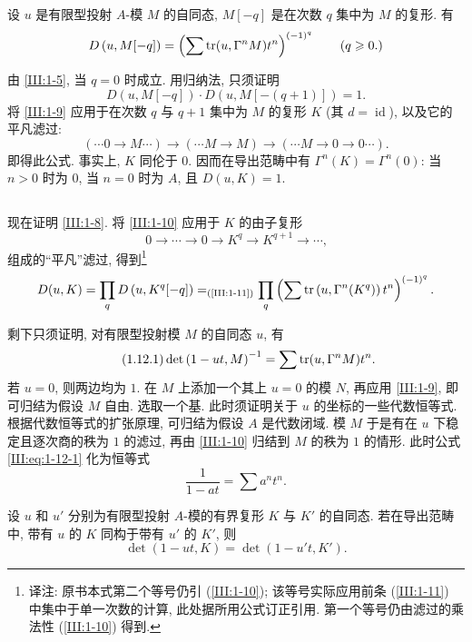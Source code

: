 \begin{lemma_}\label{III:1-11}
设 $u$ 是有限型投射 $A$-模 $M$ 的自同态, $M[-q]$ 是在次数 $q$ 集中为 $M$ 的复形. 有
\[
  D\left(u,M[-q]\right) = \left(\sum \operatorname{tr}(u,\Gamma^n M) t^n\right)^{(-1)^q} \qquad \text{($q\geqslant 0$.)}
\]
\end{lemma_}

由 \ref{III:1-5}, 当 $q=0$ 时成立. 用归纳法, 只须证明
\[
  D\left(u,M[-q]\right) \cdot D\left(u,M[-(q+1)]\right) = 1 \text{.}
\]
将 \ref{III:1-9} 应用于在次数 $q$ 与 $q+1$ 集中为 $M$ 的复形 $K$ (其 $d=\operatorname{id}$), 以及它的平凡滤过:
\[
  (\cdots 0 \to M \cdots) \to (\cdots M \to M) \to (\cdots M \to 0 \to 0 \cdots) \text{.}
\]
即得此公式. 事实上, $K$ 同伦于 $0$. 因而在导出范畴中有 $\Gamma^n(K)=\Gamma^n(0)$: 当 $n>0$ 时为 $0$, 当 $n=0$ 时为 $A$, 且 $D(u,K)=1$.

\subsection{}\label{III:1-12}

现在证明 \ref{III:1-8}. 将 \ref{III:1-10} 应用于 $K$ 的由子复形
\[
  0 \to \cdots \to 0 \to K^q \to K^{q+1} \to \cdots \text{,}
\]
组成的“平凡”滤过, 得到\footnote{译注: 原书本式第二个等号仍引 (\ref{III:1-10}); 该等号实际应用前条 (\ref{III:1-11}) 中集中于单一次数的计算, 此处据所用公式订正引用. 第一个等号仍由滤过的乘法性 (\ref{III:1-10}) 得到.}
\[
  D(u,K) = \prod_q D\left(u,K^q[-q]\right) =_{\text{(\ref{III:1-11})}} \prod_q \left(\sum \operatorname{tr}\left(u,\Gamma^n(K^q)\right) t^n \right)^{(-1)^q} \text{.}
\]

剩下只须证明, 对有限型投射模 $M$ 的自同态 $u$, 有
\begin{equation*}\tag{1.12.1}\label{III:eq:1-12-1}
  \det\left(1-u t,M\right)^{-1} = \sum \operatorname{tr}(u,\Gamma^n M) t^n \text{.}
\end{equation*}
若 $u=0$, 则两边均为 $1$. 在 $M$ 上添加一个其上 $u=0$ 的模 $N$, 再应用 \ref{III:1-9}, 即可归结为假设 $M$ 自由. 选取一个基. 此时须证明关于 $u$ 的坐标的一些代数恒等式. 根据代数恒等式的扩张原理, 可归结为假设 $A$ 是代数闭域. 模 $M$ 于是有在 $u$ 下稳定且逐次商的秩为 $1$ 的滤过, 再由 \ref{III:1-10} 归结到 $M$ 的秩为 $1$ 的情形. 此时公式 \eqref{III:eq:1-12-1} 化为恒等式
\[
  \frac{1}{1-a t} = \sum a^n t^n \text{.}
\]

\begin{corollary_}\label{III:1-13}
设 $u$ 和 $u'$ 分别为有限型投射 $A$-模的有界复形 $K$ 与 $K'$ 的自同态. 若在导出范畴中, 带有 $u$ 的 $K$ 同构于带有 $u'$ 的 $K'$, 则
\[
  \det(1-u t,K) = \det(1-u' t,K') \text{.}
\]
\end{corollary_}

